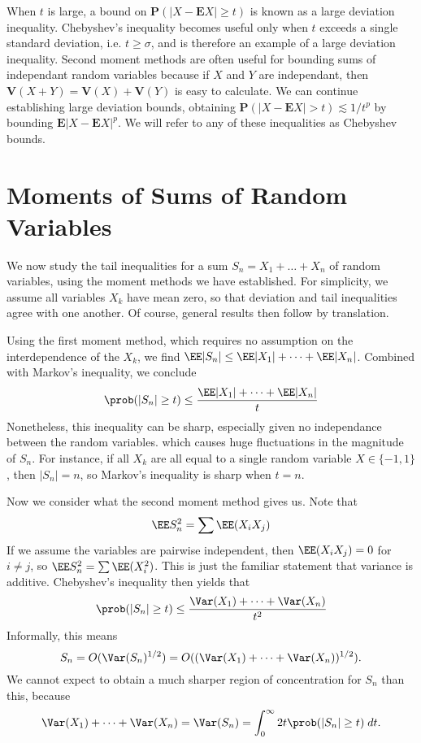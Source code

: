 When $t$ is large, a bound on $\mathbf{P}(|X - \mathbf{E}X| \geq t)$ is known as a large deviation inequality. Chebyshev's inequality becomes useful only when $t$ exceeds a single standard deviation, i.e. $t \geq \sigma$, and is therefore an example of a large deviation inequality. Second moment methods are often useful for bounding sums of independant random variables because if $X$ and $Y$ are independant, then $\mathbf{V}(X + Y) = \mathbf{V}(X) + \mathbf{V}(Y)$ is easy to calculate. We can continue establishing large deviation bounds, obtaining $\mathbf{P}(|X - \mathbf{E} X| > t) \lesssim 1/t^p$ by bounding $\mathbf{E}|X - \mathbf{E}X|^p$. We will refer to any of these inequalities as Chebyshev bounds.

\section{Moments of Sums of Random Variables}

We now study the tail inequalities for a sum $S_n = X_1 + \dots + X_n$ of random variables, using the moment methods we have established. For simplicity, we assume all variables $X_k$ have mean zero, so that deviation and tail inequalities agree with one another. Of course, general results then follow by translation.

Using the first moment method, which requires no assumption on the interdependence of the $X_k$, we find $\EE |S_n| \leq \EE |X_1| + \dots + \EE |X_n|$. Combined with Markov's inequality, we conclude
%
\[ \prob(|S_n| \geq t) \leq \frac{\EE |X_1| + \dots + \EE |X_n|}{t} \]
%
Nonetheless, this inequality can be sharp, especially given no independance between the random variables. which causes huge fluctuations in the magnitude of $S_n$. For instance, if all $X_k$ are all equal to a single random variable $X \in \{ -1, 1 \}$, then $|S_n| = n$, so Markov's inequality is sharp when $t = n$.

Now we consider what the second moment method gives us. Note that
%
\[ \EE S_n^2 = \sum \EE(X_i X_j) \]
%
If we assume the variables are pairwise independent, then $\EE(X_i X_j) = 0$ for $i \neq j$, so $\EE S_n^2 = \sum \EE(X_i^2)$. This is just the familiar statement that variance is additive. Chebyshev's inequality then yields that
%
\[ \prob(|S_n| \geq t) \leq \frac{\Var(X_1) + \dots + \Var(X_n)}{t^2} \]
%
Informally, this means
%
\[ S_n = O(\Var(S_n)^{1/2}) = O((\Var(X_1) + \dots + \Var(X_n))^{1/2}). \]
%
We cannot expect to obtain a much sharper region of concentration for $S_n$ than this, because
%
\[ \Var(X_1) + \dots + \Var(X_n) = \Var(S_n) = \int_0^\infty 2t \prob(|S_n| \geq t)\; dt. \]

